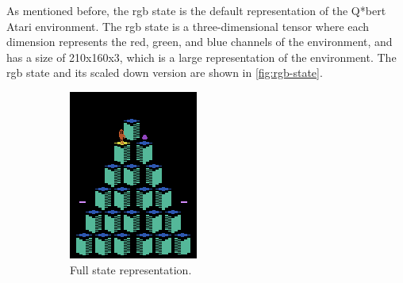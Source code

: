 As mentioned before, the \gls{rgb} state is the default representation of the
Q*bert Atari environment. The \gls{rgb} state is a three-dimensional tensor
where each dimension represents the red, green, and blue channels of the
environment, and has a size of 210x160x3, which is a large representation of
the environment. The \gls{rgb} state and its scaled down version are shown in
\cref{fig:rgb-state}.

\begin{figure}[H]
    \centering
    \begin{subfigure}{0.45\textwidth}
        \centering
        \includegraphics[width=\textwidth]{img/rgb-full-purple.png}
        \caption{Full state representation.}
        \label{fig:rgb-full}
    \end{subfigure}
    \begin{subfigure}{0.45\textwidth}
        \centering

\end{subfigure}
\end{figure}
